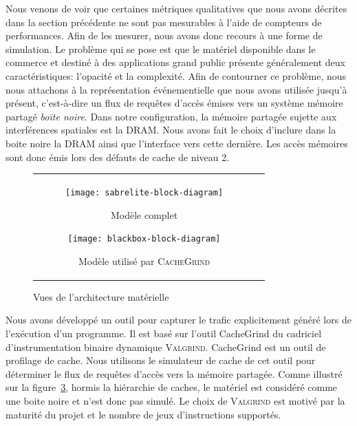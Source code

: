 Nous venons de voir que certaines métriques qualitatives que nous avons décrites dans la section précédente ne sont pas mesurables à l'aide de compteurs de performances.
Afin de les mesurer, nous avons donc recours à une forme de simulation.
Le problème qui se pose est que le matériel disponible dans le commerce et destiné à des applications grand public présente généralement deux caractéristiques: l'opacité et la complexité.
Afin de contourner ce problème, nous nous attachons à la représentation événementielle que nous avons utilisée jusqu'à présent, c'est-à-dire un flux de requêtes d'accès émises vers un système mémoire partagé \emph{boite noire}.
Dans notre configuration, la mémoire partagée sujette aux interférences spatiales est la DRAM.
Nous avons fait le choix d'inclure dans la boite noire la DRAM ainsi que l'interface vers cette dernière.
Les accès mémoires sont donc émis lors des défauts de cache de niveau 2.

\begin{figure}[H]
	\begin{tabular}{c c}
	\begin{subfigure}{0.49\linewidth}
		\texttt{[image: sabrelite-block-diagram]}
		\caption{\label{fig:abstraction_archi_full}Modèle complet}
	\end{subfigure}
	
	\begin{subfigure}{0.49\linewidth}
		\texttt{[image: blackbox-block-diagram]}
		\caption{\label{fig:abstraction_archi_blackbox}Modèle utilisé par \textsc{CacheGrind}}
	\end{subfigure}
		
	\end{tabular}
	\caption{\label{fig:abstraction:archi}Vues de l'architecture matérielle}
\end{figure}

Nous avons développé un outil pour capturer le trafic explicitement généré lors de l'exécution d'un programme.
Il est basé sur l'outil CacheGrind du cadriciel d'instrumentation binaire dynamique \textsc{Valgrind}.
CacheGrind est un outil de profilage de cache.
Nous utilisons le simulateur de cache de cet outil pour déterminer le flux de requêtes d'accès vers la mémoire partagée.
Comme illustré sur la figure~\ref{fig:abstraction:archi}, hormis la hiérarchie de caches, le matériel est considéré comme une boite noire et n'est donc pas simulé.
Le choix de \textsc{Valgrind} est motivé par la maturité du projet et le nombre de jeux d'instructions supportés.

